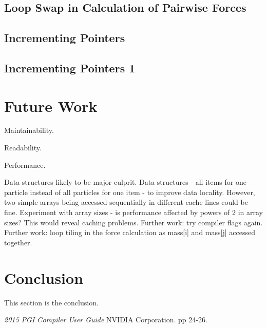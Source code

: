 \documentclass[11pt, oneside]{article}   %
\begin{document}
\subsection{Loop Swap in Calculation of Pairwise Forces}
\subsection{Incrementing Pointers}
\subsection{Incrementing Pointers 1}

\section{Future Work}

Maintainability.

Readability.

Performance.

Data structures likely to be major culprit.
Data structures - all items for one particle instead of all particles for one item - to improve data locality.  However, two simple arrays being accessed sequentially in different cache lines could be fine.
Experiment with array sizes - is performance affected by powers of 2 in array sizes?  This would reveal caching problems.  
Further work: try compiler flags again.
Further work: loop tiling in the force calculation as mass[i] and mass[j] accessed together.


\section{Conclusion}
This section is the conclusion.

\begin{thebibliography}{100}

 {\em 2015 PGI Compiler User Guide} NVIDIA Corporation. pp 24-26.

\end{thebibliography}
\end{document}
